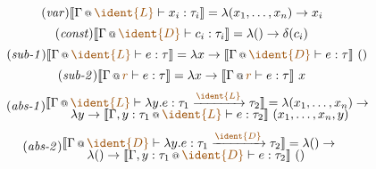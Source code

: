 \begin{figure}
\begin{equation}
\tag{\emph{var}}
\sem{\coctx{\Gamma}{\aclrd{ \ident{L} }} \vdash x_i : \tau_i} = \lambda (x_1, \ldots, x_n) \rightarrow x_i
\end{equation}
\vspace{-1.75em}
\begin{equation}
\tag{\emph{const}}
\sem{\coctx{\Gamma}{\aclrd{ \ident{D} }} \vdash c_i : \tau_i} = \lambda () \rightarrow \delta(c_i)
\end{equation}
%
%
\vspace{-0.5em}
%
%
\begin{equation}
\tag{\emph{sub-1}}
\sem{\coctx{\Gamma}{\aclrd{\ident{L} }} \vdash e : \tau} = \lambda x \rightarrow 
  \sem{\coctx{\Gamma}{\aclrd{\ident{D} }} \vdash e : \tau}~()
\end{equation}
\vspace{-1.75em}
\begin{equation}
\tag{\emph{sub-2}}
\sem{\coctx{\Gamma}{\aclrd{r}} \vdash e : \tau} = \lambda x \rightarrow 
  \sem{\coctx{\Gamma}{\aclrd{r}} \vdash e : \tau}~x
\end{equation}
%
%
\vspace{-0.5em}
%
%
\begin{equation}
\tag{\emph{abs-1}}
\hspace{-0.5em}
\begin{array}{l}
  \sem{\coctx{\Gamma}{\aclrd{\ident{L}}} \vdash \lambda y. e : \tau_1 \xrightarrow{\aclrd{\ident{L}}} \tau_2 } = \lambda (x_1, \ldots, x_n) \rightarrow\\[-0.25em]
  \qquad\lambda y \rightarrow \sem{ \coctx{\Gamma,y:\tau_1}{\aclrd{\ident{L}}} \vdash e : \tau_2 }~(x_1, \ldots, x_n, y)   	 
\end{array}
\end{equation}
\vspace{-1.0em}
\begin{equation}
\tag{\emph{abs-2}}
\hspace{-0.5em}
\begin{array}{l}
  \sem{\coctx{\Gamma}{\aclrd{\ident{D}}} \vdash \lambda y. e : \tau_1 \xrightarrow{\aclrd{\ident{D}}} \tau_2 } = \lambda () \rightarrow\\[-0.25em]
  \qquad\lambda () \rightarrow \sem{ \coctx{\Gamma,y:\tau_1}{\aclrd{\ident{D}}} \vdash e : \tau_2 }~()
\end{array}
\end{equation}
%
%
\vspace{0.0em}

\end{figure}
